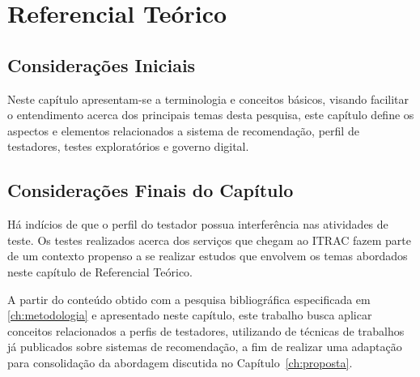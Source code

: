 \chapter{Referencial Teórico}
\label{ch:referencial}

\section{Considerações Iniciais}
Neste capítulo apresentam-se a terminologia e conceitos básicos, visando facilitar o entendimento acerca dos principais temas desta pesquisa, este capítulo define os aspectos e elementos relacionados a sistema de
recomendação, perfil de testadores, testes exploratórios e governo digital.







\section{Considerações Finais do Capítulo}

Há indícios de que o perfil do testador possua interferência nas atividades de teste. Os testes realizados acerca dos serviços que chegam ao ITRAC fazem parte de um contexto propenso a se realizar estudos que envolvem os temas abordados neste capítulo de Referencial Teórico.

A partir do conteúdo obtido com a pesquisa bibliográfica especificada em \ref{ch:metodologia} e apresentado neste capítulo, este trabalho busca aplicar conceitos relacionados a perfis de testadores, utilizando de técnicas de trabalhos já publicados sobre sistemas de recomendação, a fim de realizar uma adaptação para consolidação da abordagem discutida no Capítulo~\ref{ch:proposta}. 

